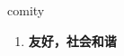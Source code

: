 
\begin{frame}
{\huge comity}
\begin{center}
\begin{enumerate}\Large
  \item \textbf{友好，社会和谐}
\end{enumerate}
\end{center}
\end{frame}
